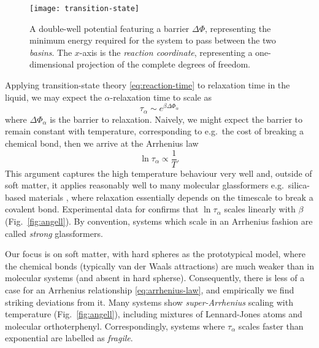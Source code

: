\begin{SCfigure}
  \texttt{[image: transition-state]}
  \caption[Transition state theory]{
    A double-well potential featuring a barrier $\Delta\Phi$, representing the minimum energy required for the system to pass between the two \emph{basins}.
    The $x$-axis is the \emph{reaction coordinate}, representing a one-dimensional projection of the complete degrees of freedom.
  }
  \label{fig:transition-state}
\end{SCfigure}

Applying transition-state theory \eqref{eq:reaction-time} to relaxation time in the liquid, we may expect the $\alpha$-relaxation time to scale as
\begin{equation}\label{eq:tau-barrier}
  \tau_\alpha \sim e^{\beta \Delta \Phi_\alpha}
\end{equation}
where $\Delta \Phi_\alpha$ is the barrier to relaxation.
Naively, we might expect the barrier to remain constant with temperature, corresponding to e.g.\ the cost of breaking a chemical bond, then we arrive at the Arrhenius law
\begin{equation}\label{eq:arrhenius-law}
  \ln{\tau_\alpha} \propto \frac{1}{T}.
\end{equation}
This argument captures the high temperature behaviour very well and, outside of soft matter, it applies reasonably well to many molecular glassformers e.g.\ silica-based materials%
,
where relaxation essentially depends on the timescale to break a covalent bond.
Experimental data for  \cite{AngellS1995} confirms that $\ln{\tau_\alpha}$ scales linearly with $\beta$ (Fig.\ \ref{fig:angell}).
By convention, systems which scale in an Arrhenius fashion are called \emph{strong}%
glassformers.

Our focus is on soft matter, with hard spheres as the prototypical model, where the  chemical bonds (typically van der Waals attractions) are much weaker than in molecular systems (and absent in hard spherse).
Consequently, there is less of a case for an Arrhenius relationship \eqref{eq:arrhenius-law}, and empirically we find striking deviations from it.
Many systems show \emph{super-Arrhenius} scaling with temperature (Fig.\ \ref{fig:angell}), including mixtures of Lennard-Jones atoms and molecular orthoterphenyl.
Correspondingly, systems where $\tau_\alpha$ scales faster than exponential are labelled as \emph{fragile}.

